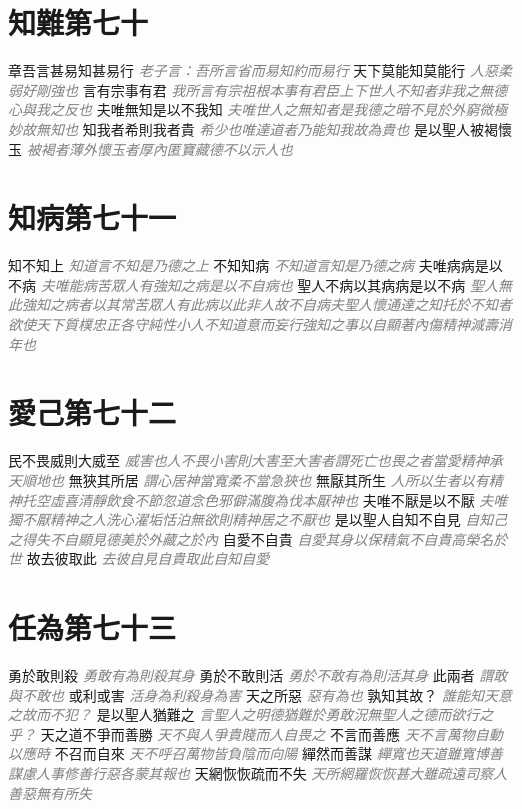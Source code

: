 \documentclass[a4paper,zihao=-4,oneside,landscape,UTF8]{ctexart}
\newcommand{\zhushi}[1]{\scriptsize{\textit{\textcolor{gray}{#1}}}\normalsize}
\begin{document}
\section{知難第七十}

章吾言甚易知甚易行
\zhushi{老子言：吾所言省而易知約而易行}
天下莫能知莫能行
\zhushi{人惡柔弱好剛強也}
言有宗事有君
\zhushi{我所言有宗祖根本事有君臣上下世人不知者非我之無德心與我之反也}
夫唯無知是以不我知
\zhushi{夫唯世人之無知者是我德之暗不見於外窮微極妙故無知也}
知我者希則我者貴
\zhushi{希少也唯達道者乃能知我故為貴也}
是以聖人被褐懷玉
\zhushi{被褐者薄外懷玉者厚內匿寶藏德不以示人也}


\section{知病第七十一}

知不知上
\zhushi{知道言不知是乃德之上}
不知知病
\zhushi{不知道言知是乃德之病}
夫唯病病是以不病
\zhushi{夫唯能病苦眾人有強知之病是以不自病也}
聖人不病以其病病是以不病
\zhushi{聖人無此強知之病者以其常苦眾人有此病以此非人故不自病夫聖人懷通達之知托於不知者欲使天下質樸忠正各守純性小人不知道意而妄行強知之事以自顯著內傷精神減壽消年也}


\section{愛己第七十二}

民不畏威則大威至
\zhushi{威害也人不畏小害則大害至大害者謂死亡也畏之者當愛精神承天順地也}
無狹其所居
\zhushi{謂心居神當寬柔不當急狹也}
無厭其所生
\zhushi{人所以生者以有精神托空虛喜清靜飲食不節忽道念色邪僻滿腹為伐本厭神也}
夫唯不厭是以不厭
\zhushi{夫唯獨不厭精神之人洗心濯垢恬泊無欲則精神居之不厭也}
是以聖人自知不自見
\zhushi{自知己之得失不自顯見德美於外藏之於內}
自愛不自貴
\zhushi{自愛其身以保精氣不自貴高榮名於世}
故去彼取此
\zhushi{去彼自見自貴取此自知自愛}


\section{任為第七十三}

勇於敢則殺
\zhushi{勇敢有為則殺其身}
勇於不敢則活
\zhushi{勇於不敢有為則活其身}
此兩者
\zhushi{謂敢與不敢也}
或利或害
\zhushi{活身為利殺身為害}
天之所惡
\zhushi{惡有為也}
孰知其故？
\zhushi{誰能知天意之故而不犯？}
是以聖人猶難之
\zhushi{言聖人之明德猶難於勇敢況無聖人之德而欲行之乎？}
天之道不爭而善勝
\zhushi{天不與人爭貴賤而人自畏之}
不言而善應
\zhushi{天不言萬物自動以應時}
不召而自來
\zhushi{天不呼召萬物皆負陰而向陽}
繟然而善謀
\zhushi{繟寬也天道雖寬博善謀慮人事修善行惡各蒙其報也}
天網恢恢疏而不失
\zhushi{天所網羅恢恢甚大雖疏遠司察人善惡無有所失}
\end{document}
